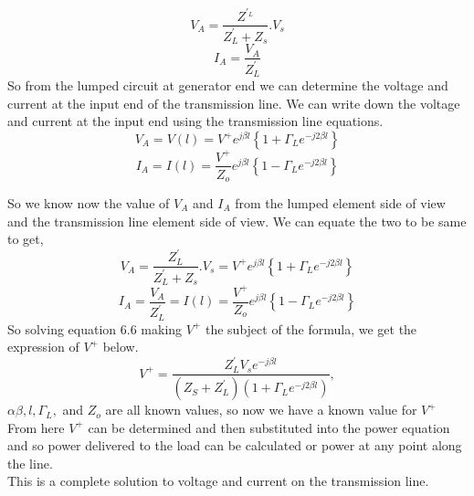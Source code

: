    		
\begin{equation}
V_A = \frac{Z^{'_L}}{Z^{'}_L + Z_s} . V_s
\end{equation}
\begin{equation}
 I_A = \frac{V_A}{Z^{'}_L}
\end{equation} 
 So from the lumped circuit at generator end we can determine the voltage and current at the input end of the transmission line. We can write down the voltage and current at the input end using the transmission line equations.
 \begin{equation*} 
 V_A= V(l) = V^+ e^{j\beta l} \left\lbrace 1 + \Gamma_L e^{-j2\beta l} \right\rbrace 
 \end{equation*} 
 \begin{equation*}
 I_A = I(l) = \frac{V^+}{Z_o} e^{j\beta l} \left\lbrace 1 - \Gamma_L e^{-j2\beta l} \right\rbrace
 \end{equation*}
 
 So we know now the value of $V_A$ and $I_A$ from the lumped element side of view and the transmission line element side of view. We can equate the two to be same to get,
 \begin{equation} 
 V_A = \frac{Z^{'}_L}{Z^{'}_L + Z_s} . V_s = V^+ e^{j\beta l} \left\lbrace 1 + \Gamma_L e^{-j2\beta l} \right\rbrace 
 \end{equation}
 \begin{equation}
 I_A = \frac{V_A}{Z^{'}_L} = I(l) = \frac{V^+}{Z_o} e^{j\beta l} \left\lbrace 1 - \Gamma_L e^{-j2\beta l} \right\rbrace
 \end{equation}
 So solving equation $6.6$ making $V^{+}$ the subject of the formula, we get the expression of $V^+$ below. 
 \begin{equation} 
 V^+ = \frac{Z^{'}_L V_s e^{-j\beta l}}{(Z_S + Z^{'}_L)(1 + \Gamma_L e^{-j2\beta l })}, 
 \end{equation}
 $\alpha \beta , l  , \Gamma_L,$ and $Z_o$ are all known values, so now we have a known value for $V^+$\\
 
 From here $V^+$ can be determined and then substituted into the power equation and so power delivered to the load can be calculated or power at any point along the line.\\
 This is a complete solution to voltage and current on the transmission line.
 
